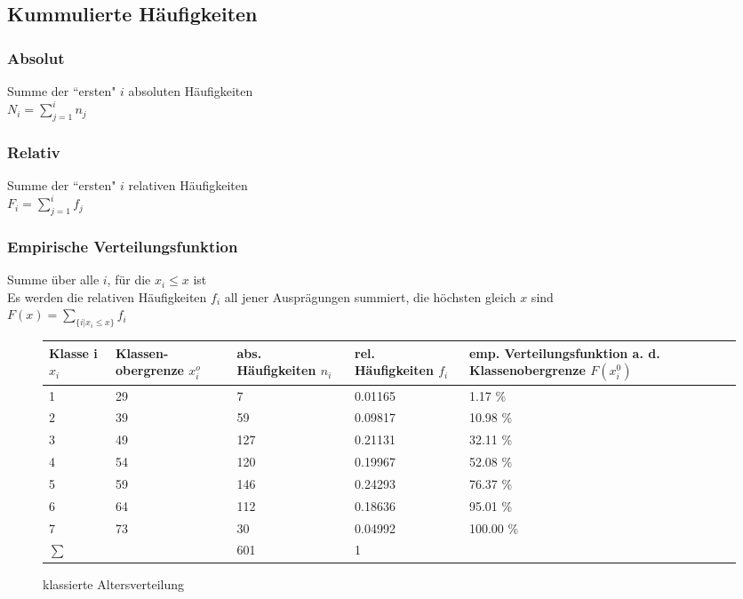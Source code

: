 \documentclass[10pt,a4paper]{article}
\begin{document}
\subsection{Kummulierte Häufigkeiten}
\subsubsection{Absolut}

Summe der ``ersten" $i$ absoluten Häufigkeiten\\

$N_i = \sum\limits^i_{j = 1}n_j$

\subsubsection{Relativ}

Summe der ``ersten" $i$ relativen Häufigkeiten\\

$F_i = \sum\limits^i_{j=1}f_j$

\subsubsection{Empirische Verteilungsfunktion}

Summe über alle $i$, für die $x_i \leqslant x$ ist \\
Es werden die relativen Häufigkeiten $f_i$ all jener Ausprägungen summiert, die 
höchsten gleich $x$ sind\\

$F(x) = \sum\limits_{\{i|x_i \leqslant x\}} f_i$

\begin{figure}[!h]
\begin{tabular}{|p{2cm}|p{2cm}|p{2cm}|p{3cm}|p{4cm}|} 
\hline Klasse i $x_i$ & Klassen-obergrenze $x_i^o$ & abs. Häufigkeiten $n_i$ & rel. Häufigkeiten $f_i$ & emp. Verteilungsfunktion a. d. Klassenobergrenze $F(x_i^0)$ \\
\hline 1 & 29 & 7 & 0.01165 & 1.17 \% \\
\hline 2 & 39 & 59 & 0.09817 & 10.98 \%  \\
\hline 3 & 49 & 127 & 0.21131 & 32.11 \%\\
\hline 4 & 54 & 120 & 0.19967 & 52.08 \%\\
\hline 5 & 59 & 146 & 0.24293 & 76.37 \%\\
\hline 6 & 64 & 112 & 0.18636 & 95.01 \%\\
\hline 7 & 73 & 30 & 0.04992 & 100.00 \%\\
\hline $\sum$ & & 601 & 1 & \\
\hline 
\end{tabular}
\caption{klassierte Altersverteilung}
\end{figure}
\end{document}
